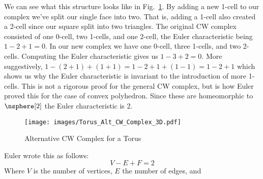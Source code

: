 \documentclass{book}                                                           %
\begin{document}
            \hfill
            \par\vspace{2.5ex}
            We can see what this structure looks like in
            Fig.~\ref{fig:Alt_CW_Complex_for_Torus_3D}. By adding a new 1-cell
            to our complex we've split our single face into two. That is, adding
            a 1-cell also created a 2-cell since our square split into two
            triangles. The original CW complex consisted of one 0-cell, two
            1-cells, and one 2-cell, the Euler characteristic being $1-2+1=0$.
            In our new complex we have one 0-cell, three 1-cells, and two
            2-cells. Computing the Euler characteristic gives us $1-3+2=0$. More
            suggestively, $1-(2+1)+(1+1)=1-2+1+(1-1)=1-2+1$ which shows us why
            the Euler characteristic is invariant to the introduction of more
            1-cells. This is not a rigorous proof for the general CW complex,
            but is how Euler proved this for the case of convex polyhedron.
            Since these are homeomorphic to $\nsphere[2]$ the Euler
            characteristic is 2.
            \begin{figure}
                \centering
                \captionsetup{type=figure}
                \if{}
                    \texttt{[image: images/Torus\_Alt\_CW\_Complex\_3D.pdf]}
                \fi
                \caption{Alternative CW Complex for a Torus}
                \label{fig:Alt_CW_Complex_for_Torus_3D}
            \end{figure}
            Euler wrote this as follows:
            \begin{equation}
                V-E+F=2
            \end{equation}
            Where $V$ is the number of vertices, $E$ the number of edges, and
\end{document}
